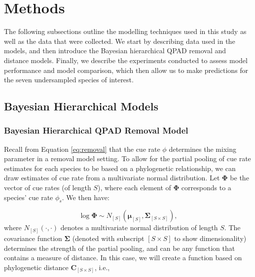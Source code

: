 \documentclass[12pt]{article}
\begin{document}
\section{Methods}

\par The following subsections outline the modelling techniques used in this study as well as the data that were collected. 
We start by describing data used in the models, and then introduce the Bayesian hierarchical QPAD removal and distance models.
Finally, we describe the experiments conducted to assess model performance and model comparison, which then allow us to make predictions for the seven undersampled species of interest.

\subsection{Bayesian Hierarchical Models}

\subsubsection{Bayesian Hierarchical QPAD Removal Model}\label{section-removal-models}
 
\par Recall from Equation \ref{eq:removal} that the cue rate $\phi$ determines the mixing parameter in a removal model setting.
To allow for the partial pooling of cue rate estimates for each species to be based on a phylogenetic relationship, we can draw estimates of cue rate from a multivariate normal distribution. 
Let $\mathbf{\Phi}$ be the vector of cue rates (of length $S$), where each element of $\mathbf{\Phi}$ corresponds to a species' cue rate $\phi_s$.
We then have:

$$\log \mathbf{\Phi} \sim N_{[S]}\left( \mathbf{\mu}_{[S]}, \mathbf{\Sigma}_{[S \times S]} \right),$$
where $N_{[S]}(\cdot,\cdot)$ denotes a multivariate normal distribution of length $S$.
The covariance function $\mathbf{\Sigma}$ (denoted with subscript $[S \times S]$ to show dimensionality) determines the strength of the partial pooling, and can be any function that contains a measure of distance. 
In this case, we will create a function based on phylogenetic distance $\mathbf{C}_{[S \times S]}$, i.e.,
\end{document}
